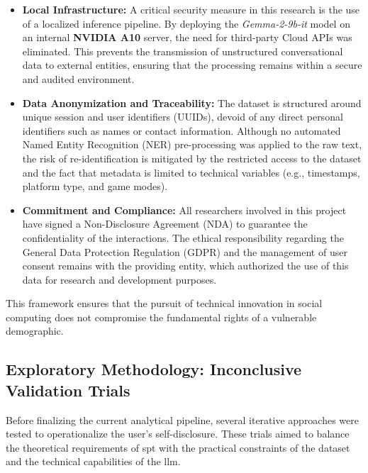 \begin{itemize}
    \item \textbf{Local Infrastructure:} A critical security measure in this research is the use of a localized inference pipeline. By deploying the \textit{Gemma-2-9b-it} model on an internal \textbf{NVIDIA A10} server, the need for third-party Cloud APIs was eliminated. This prevents the transmission of unstructured conversational data to external entities, ensuring that the processing remains within a secure and audited environment.
    
    \item \textbf{Data Anonymization and Traceability:} The dataset is structured around unique session and user identifiers (UUIDs), devoid of any direct personal identifiers such as names or contact information. Although no automated Named Entity Recognition (NER) pre-processing was applied to the raw text, the risk of re-identification is mitigated by the restricted access to the dataset and the fact that metadata is limited to technical variables (e.g., timestamps, platform type, and game modes).
    
    \item \textbf{Commitment and Compliance:} All researchers involved in this project have signed a Non-Disclosure Agreement (NDA) to guarantee the confidentiality of the interactions. The ethical responsibility regarding the General Data Protection Regulation (GDPR) and the management of user consent remains with the providing entity, which authorized the use of this data for research and development purposes.
\end{itemize}

This framework ensures that the pursuit of technical innovation in social computing does not compromise the fundamental rights of a vulnerable demographic.












    \subsection{Exploratory Methodology: Inconclusive Validation Trials}

\label{sec:inconclusive_trials}

Before finalizing the current analytical pipeline, several iterative approaches were tested to operationalize the user's self-disclosure. These trials aimed to balance the theoretical requirements of spt with the practical constraints of the dataset and the technical capabilities of the llm.

